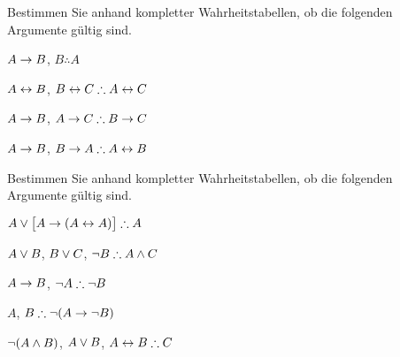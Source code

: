 \noindent\problempart
\label{pr.TT.valid2}
Bestimmen Sie anhand kompletter Wahrheitstabellen, ob die folgenden Argumente gültig sind.
\begin{earg}
\item $A\rightarrow B$, $B \therefore  A$ %

\item $A\leftrightarrow B$, $B\eiff C \therefore A\eiff C$ %

\item $A \rightarrow B$, $A \eif C\therefore B \eif C$ %

\item $A \rightarrow B$, $B \eif A\therefore A \eiff B$ %

\end{earg}

\noindent\problempart
\label{pr.TT.valid3}
Bestimmen Sie anhand kompletter Wahrheitstabellen, ob die folgenden Argumente gültig sind.
\begin{earg}
\item $A\eor\bigl[A\eif(A\eiff A)\bigr] \therefore  A $\vspace{.5ex}%
\item $A\vee B$, $B\vee C$, $\enot B \therefore A \eand C$\vspace{.5ex} %
\item $A \rightarrow B$, $\enot A\therefore \enot B$ \vspace{.5ex}%
\item $A$, $B\therefore \enot(A\eif \enot B)$ \vspace{.5ex}%
\item $\neg(A \wedge B)$, $A \vee B$, $A \eiff B\therefore C$ \vspace{.5ex}%
\end{earg}

